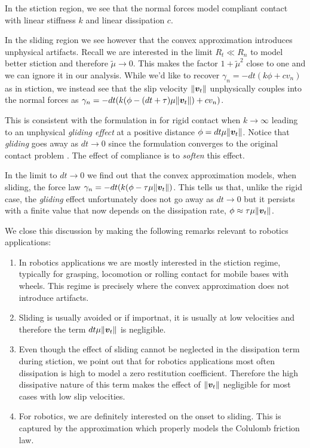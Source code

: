 In the stiction region, we see that the normal forces model compliant contact
with linear stiffness $k$ and linear dissipation $c$. 

In the sliding region we see however that the convex approximation introduces
unphysical artifacts. Recall we are interested in the limit $R_t \ll R_n$ to
model better stiction and therefore $\tilde\mu \rightarrow 0$. This makes the
factor $1+\tilde{\mu}^2$ close to one and we can ignore it in our analysis.
While we'd like to recover $\gamma_n = -dt(k\phi + c v_n)$ as in stiction, we
instead see that the slip velocity $\Vert{\bm{v}}_t\Vert$ unphysically couples
into the normal forces as $\gamma_n=-dt(k(\phi-(dt+\tau)\mu\Vert{\bm{v}}_t\Vert) +
cv_n)$. 

This is consistent with the formulation in \cite{bib:anitescu2010} for rigid
contact when $k\rightarrow \infty$ leading to an unphysical \textit{gliding
effect} at a positive distance $\phi=dt\mu\Vert{\bm{v}}_t\Vert$. Notice that
\textit{gliding} goes away as $dt\rightarrow 0$ since the formulation converges
to the original contact problem \cite{bib:anitescu2006}. The effect of
compliance is to \textit{soften} this effect. 

In the limit to $dt\rightarrow 0$ we find out that the convex approximation
models, when sliding, the force law
$\gamma_n=-dt(k(\phi-\tau\mu\Vert{\bm{v}}_t\Vert)$. This tells us that, unlike the
rigid case, the \textit{gliding} effect unfortunately does not go away as
$dt\rightarrow 0$ but it persists with a finite value that now depends on the
dissipation rate, $\phi\approx\tau\mu\Vert{\bm{v}}_t\Vert$.

We close this discussion by making the following remarks relevant to robotics
applications:
\begin{enumerate}
	\item In robotics applications we are mostly interested in the stiction
	regime, typically for grasping, locomotion or rolling contact for mobile
	bases with wheels. This regime is precisely where the convex approximation
	does not introduce artifacts.
	\item Sliding is usually avoided or if importnat, it is usually at low
	velocities and therefore the term $dt\mu\Vert{\bm{v}}_t\Vert$ is negligible.
	\item Even though the effect of sliding cannot be neglected in the
	dissipation term during stiction, we point out that for robotics
	applications most often dissipation is high to model a zero restitution
	coefficient. Therefore the high dissipative nature of this term makes the
	effect of $\Vert{\bm{v}}_t\Vert$ negligible for most cases with low slip
	velocities.
	\item For robotics, we are definitely interested on the onset to sliding.
	This is captured by the approximation which properly models the Colulomb
	friction law.
\end{enumerate}

